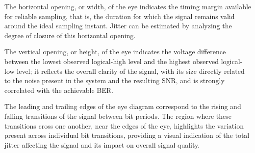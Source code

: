 The horizontal opening, or width, of the eye indicates the timing margin available for reliable sampling, that is, the duration for which the signal remains valid around the ideal sampling instant. Jitter can be estimated by analyzing the degree of closure of this horizontal opening. 

The vertical opening, or height, of the eye indicates the voltage difference between the lowest observed logical-high level and the highest observed logical-low level; it reflects the overall clarity of the signal, with its size directly related to the noise present in the system and the resulting \ac{SNR}, and is strongly correlated with the achievable \ac{BER}.

The leading and trailing edges of the eye diagram correspond to the rising and falling transitions of the signal between bit periods. The region where these transitions cross one another, near the edges of the eye, highlights the variation present across individual bit transitions, providing a visual indication of the total jitter affecting the signal and its impact on overall signal quality.

